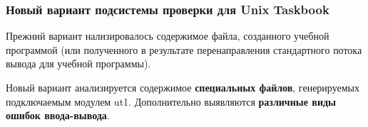 \begin{frame}
\end{frame}


\begin{frame}
\frametitle{Новый вариант подсистемы проверки для Unix Taskbook}

\begin{block}{Прежний вариант}
    нализировалось содержимое файла, созданного учебной программой (или полученного в результате перенаправления стандартного потока вывода для учебной программы).
\end{block}

\begin{block}{Новый вариант}
анализируется содержимое \textbf{специальных файлов}, генерируемых подключаемым модулем ut1. Дополнительно выявляются \textbf{различные виды ошибок ввода-вывода}.
\end{block}



\end{frame}
